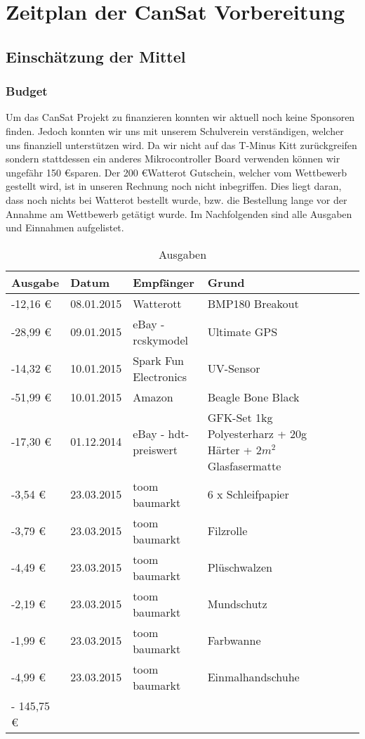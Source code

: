 \section{Zeitplan der CanSat Vorbereitung}

\subsection{Einschätzung der Mittel}
\subsubsection{Budget}

\label{subsubsec:Budget}

Um das CanSat Projekt zu finanzieren konnten wir aktuell noch keine Sponsoren finden. Jedoch konnten wir uns mit unserem Schulverein verständigen, welcher uns finanziell unterstützen wird. Da wir nicht auf das T-Minus Kitt zurückgreifen sondern stattdessen ein anderes Mikrocontroller Board verwenden können wir ungefähr 150  \euro  sparen. Der 200 \euro Watterot Gutschein, welcher vom Wettbewerb gestellt wird, ist in unseren Rechnung noch nicht inbegriffen. Dies liegt daran, dass noch nichts bei Watterot bestellt wurde, bzw. die Bestellung lange vor der Annahme am Wettbewerb getätigt wurde.
Im Nachfolgenden sind alle Ausgaben und Einnahmen aufgelistet.
\begin{table}[htbp]
  \centering
  \caption{Ausgaben}
    \begin{tabular}{p{}p{}p{}p{}rrrl}
    \toprule
    \textbf{Ausgabe} & \textbf{Datum} & \textbf{Empfänger} & \textbf{Grund} \\
    \midrule
    -12,16 \euro  & 08.01.2015 & Watterott & BMP180 Breakout \\
    -28,99 \euro  & 09.01.2015 & eBay - rcskymodel & Ultimate GPS \\
    -14,32 \euro  & 10.01.2015 & Spark Fun Electronics & UV-Sensor \\
    -51,99 \euro  & 10.01.2015 & Amazon & Beagle Bone Black \\
    -17,30 \euro  & 01.12.2014 & eBay - hdt-preiswert & 
GFK-Set 1kg Polyesterharz + 20g Härter + $2m^2$ Glasfasermatte \\
    -3,54 \euro  & 23.03.2015 & toom baumarkt & 6 x Schleifpapier \\
    -3,79 \euro  & 23.03.2015 & toom baumarkt & Filzrolle \\
    -4,49 \euro  & 23.03.2015 & toom baumarkt & Plüschwalzen \\
    -2,19 \euro  & 23.03.2015 & toom baumarkt & Mundschutz \\
    -1,99 \euro  & 23.03.2015 & toom baumarkt & Farbwanne \\
    -4,99 \euro  & 23.03.2015 & toom baumarkt & Einmalhandschuhe \\
    \bottomrule
    - 145,75 \euro & & & \\
    \bottomrule
    \end{tabular}%
  \label{tab:budgetausgaben}%
\end{table}%

